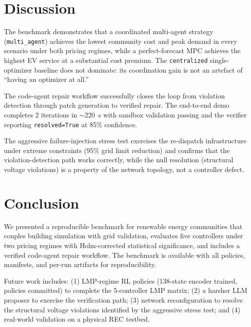 \documentclass[sigconf,nonacm]{acmart}
\begin{document}


\section{Discussion}\label{sec:discussion}

The benchmark demonstrates that a coordinated multi-agent strategy
(\texttt{multi\_agent}) achieves the lowest community cost and peak demand in
every scenario under both pricing regimes, while a perfect-forecast MPC
achieves the highest EV service at a substantial cost premium. The
\texttt{centralized} single-optimizer baseline does not dominate: its
coordination gain is not an artefact of ``having an optimizer at all.''

The code-agent repair workflow successfully closes the loop from violation
detection through patch generation to verified repair. The end-to-end demo
completes 2 iterations in $\sim$220~s with sandbox validation passing and the
verifier reporting \texttt{resolved=True} at 85\% confidence.

The aggressive failure-injection stress test exercises the re-dispatch
infrastructure under extreme constraints (95\% grid limit reduction) and
confirms that the violation-detection path works correctly, while the null
resolution (structural voltage violations) is a property of the network
topology, not a controller defect.

\section{Conclusion}\label{sec:conclusion}

We presented a reproducible benchmark for renewable energy communities that
couples building simulation with grid validation, evaluates five controllers
under two pricing regimes with Holm-corrected statistical significance, and
includes a verified code-agent repair workflow. The benchmark is available
with all policies, manifests, and per-run artifacts for reproducibility.

Future work includes: (1) LMP-regime RL policies (138-state encoder trained,
policies committed) to complete the 5-controller LMP matrix; (2) a harsher
LLM proposer to exercise the verification path; (3) network reconfiguration
to resolve the structural voltage violations identified by the aggressive
stress test; and (4) real-world validation on a physical REC testbed.




\end{document}
